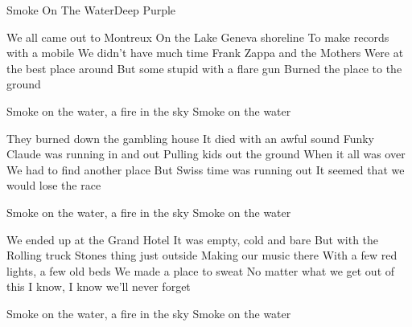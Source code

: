 \begin{Song}{Smoke On The Water}{Deep Purple}
\begin{multicols}{2}

\begin{Verse}
We all came out to Montreux
On the Lake Geneva shoreline
To make records with a mobile
We didn't have much time
Frank Zappa and the Mothers
Were at the best place around
But some stupid with a flare gun
Burned the place to the ground
\end{Verse}
\espaceInterStrophe

\begin{Chorus}
Smoke on the water, a fire in the sky
Smoke on the water
\end{Chorus}
\espaceInterStrophe

\begin{Verse}
They burned down the gambling house
It died with an awful sound
Funky Claude was running in and out
Pulling kids out the ground
When it all was over
We had to find another place
But Swiss time was running out
It seemed that we would lose the race
\end{Verse}
\espaceInterStrophe

\begin{Chorus}
Smoke on the water, a fire in the sky
Smoke on the water
\end{Chorus}
\columnbreak

\espaceInterStrophe

\begin{Verse}
We ended up at the Grand Hotel
It was empty, cold and bare
But with the Rolling truck Stones thing just outside
Making our music there
With a few red lights, a few old beds
We made a place to sweat
No matter what we get out of this
I know, I know we'll never forget
\end{Verse}
\espaceInterStrophe

\begin{Chorus}
Smoke on the water, a fire in the sky
Smoke on the water
\end{Chorus}
\espaceInterStrophe

\end{multicols}

\vfill

\begin{multicols}{2}

\gridGroupNormal

\begin{Chords}
\hline
\\\hline
\end{Chords}
\espaceInterGrille


\begin{Chords}
\hline
\\\hline
\end{Chords}

\end{multicols}

\vfill

\end{Song}



